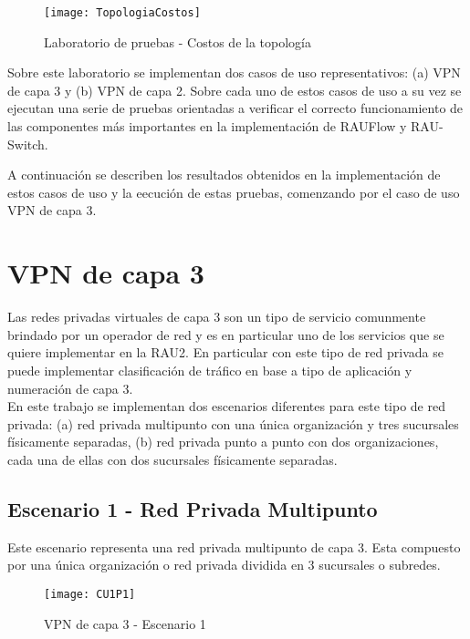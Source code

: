 \begin{figure}[ht!] 
\centering    
\texttt{[image: TopologiaCostos]}
\caption[Laboratorio de pruebas - Costos de la topolog\'ia]{Laboratorio de pruebas - Costos de la topolog\'ia}
\label{fig:LaboratorioDePruebasCostos}
\end{figure}

Sobre este laboratorio se implementan dos casos de uso representativos: (a) VPN de capa 3 y (b) VPN de capa 2. Sobre cada uno de estos casos de uso a su vez se ejecutan una serie de pruebas orientadas a verificar el correcto funcionamiento de las componentes m\'as importantes en la implementaci\'on de RAUFlow y RAU-Switch.

A continuaci\'on se describen los resultados obtenidos en la implementaci\'on de estos casos de uso y la eecuci\'on de estas pruebas, comenzando por el caso de uso VPN de capa 3.

\section{VPN de capa 3}

Las redes privadas virtuales de capa 3 son un tipo de servicio comunmente brindado por un operador de red y es en particular uno de los servicios que se quiere implementar en la RAU2. En particular con este tipo de red privada se puede implementar clasificaci\'on de tr\'afico en base a tipo de aplicaci\'on y numeraci\'on de capa 3.\\

En este trabajo se implementan dos escenarios diferentes para este tipo de red privada: (a) red privada multipunto con una \'unica organizaci\'on y tres sucursales f\'isicamente separadas, (b) red privada punto a punto con dos organizaciones, cada una de ellas con dos sucursales f\'isicamente separadas.

\subsection{Escenario 1 - Red Privada Multipunto}

Este escenario representa una red privada multipunto de capa 3. Esta compuesto por una \'unica organizaci\'on o red privada dividida en 3 sucursales o subredes.

\begin{figure}[ht!] 
\centering    
\texttt{[image: CU1P1]}
\caption[VPN de capa 3 - Escenario 1]{VPN de capa 3 - Escenario 1}
\label{fig:CUP1}
\end{figure}

